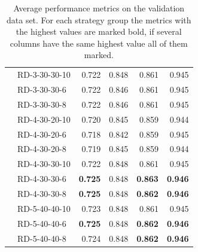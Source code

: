 \begin{table}[ht]
\begin{tabular}{llrrrr}
		                         & RD-3-30-30-10  & 0.722          & 0.848          & 0.861          & 0.945          \\
		                         & RD-3-30-30-6   & 0.722          & 0.846          & 0.861          & 0.945          \\
		                         & RD-3-30-30-8   & 0.722          & 0.846          & 0.861          & 0.945          \\
		                         & RD-4-30-20-10  & 0.720          & 0.845          & 0.859          & 0.944          \\
		                         & RD-4-30-20-6   & 0.718          & 0.842          & 0.859          & 0.945          \\
		                         & RD-4-30-20-8   & 0.719          & 0.845          & 0.859          & 0.944          \\
		                         & RD-4-30-30-10  & 0.722          & 0.848          & 0.861          & 0.945          \\
		                         & RD-4-30-30-6   & \textbf{0.725} & 0.848          & \textbf{0.863} & \textbf{0.946} \\
		                         & RD-4-30-30-8   & \textbf{0.725} & 0.848          & \textbf{0.862} & \textbf{0.946} \\
		                         & RD-5-40-40-10  & 0.723          & 0.848          & 0.861          & 0.945          \\
		                         & RD-5-40-40-6   & \textbf{0.725} & 0.848          & \textbf{0.862} & \textbf{0.946} \\
		                         & RD-5-40-40-8   & 0.724          & 0.848          & \textbf{0.862} & \textbf{0.946} \\
		\bottomrule
	\end{tabular}
	\caption[Average performance metrics on the validation data set.]{Average performance metrics on the validation data set.
		For each strategy group the metrics with the highest values are marked bold, if several columns have the same highest value
		all of them marked.}
	\label{tab:featurePerformance_validationDataset}
\end{table}

\clearpage

